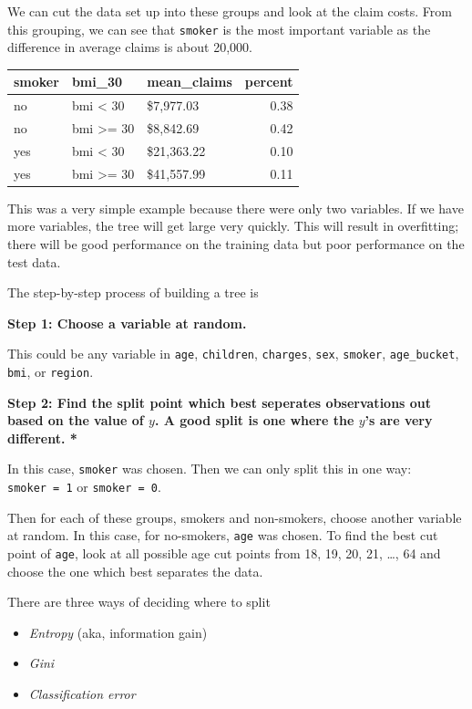 \documentclass[openany]{book}
\providecommand{\tightlist}{%
  \setlength{\itemsep}{0pt}\setlength{\parskip}{0pt}}
\begin{document}
We can cut the data set up into these groups and look at the claim costs. From this grouping, we can see that \texttt{smoker} is the most important variable as the difference in average claims is about 20,000.

\begin{longtable}[]{@{}lllr@{}}
\toprule
smoker & bmi\_30 & mean\_claims & percent\tabularnewline
\midrule
\endhead
no & bmi \textless{} 30 & \$7,977.03 & 0.38\tabularnewline
no & bmi \textgreater= 30 & \$8,842.69 & 0.42\tabularnewline
yes & bmi \textless{} 30 & \$21,363.22 & 0.10\tabularnewline
yes & bmi \textgreater= 30 & \$41,557.99 & 0.11\tabularnewline
\bottomrule
\end{longtable}

This was a very simple example because there were only two variables. If we have more variables, the tree will get large very quickly. This will result in overfitting; there will be good performance on the training data but poor performance on the test data.

The step-by-step process of building a tree is

\textbf{Step 1: Choose a variable at random.}

This could be any variable in \texttt{age}, \texttt{children}, \texttt{charges}, \texttt{sex}, \texttt{smoker}, \texttt{age\_bucket}, \texttt{bmi}, or \texttt{region}.

\textbf{Step 2: Find the split point which best seperates observations out based on the value of \(y\). A good split is one where the \(y\)'s are very different. * }

In this case, \texttt{smoker} was chosen. Then we can only split this in one way: \texttt{smoker\ =\ 1} or \texttt{smoker\ =\ 0}.

Then for each of these groups, smokers and non-smokers, choose another variable at random. In this case, for no-smokers, \texttt{age} was chosen. To find the best cut point of \texttt{age}, look at all possible age cut points from 18, 19, 20, 21, \ldots, 64 and choose the one which best separates the data.

There are three ways of deciding where to split

\begin{itemize}
\tightlist
\item
  \emph{Entropy} (aka, information gain)
\item
  \emph{Gini}
\item
  \emph{Classification error}
\end{itemize}
\end{document}

